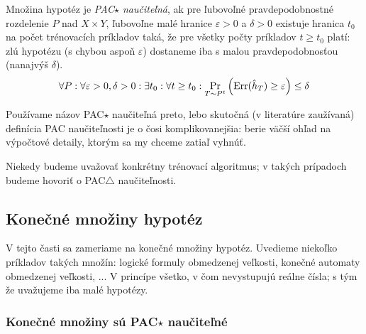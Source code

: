 \begin{definition}
  Množina hypotéz je \emph{PAC$\star$ naučiteľná}, ak pre ľubovoľné pravdepodobnostné
  rozdelenie $P$ nad $X \times Y$, ľubovoľne malé hranice $\varepsilon > 0$ a $\delta > 0$
  existuje hranica $t_0$ na počet trénovacích príkladov taká, že pre všetky
  počty príkladov $t \geq t_0$ platí: zlú hypotézu (s chybou
  aspoň $\varepsilon$) dostaneme iba s malou pravdepodobnosťou
  (nanajvýš $\delta$).
  $$ \forall P: \forall \varepsilon > 0, \delta > 0: \exists t_0: \forall t \geq t_0: \operatorname*{\textstyle\mathrm{Pr}}_{T \sim P^t} \left( \mathrm{Err}(\hat{h}_T) \geq \varepsilon \right) \leq \delta $$
\end{definition}

Používame názov PAC$\star$ naučiteľná preto, lebo skutočná (v literatúre
zaužívaná) definícia PAC naučiteľnosti je o čosi komplikovanejšia: berie
väčší ohľad na výpočtové detaily, ktorým sa my chceme zatiaľ vyhnúť.

Niekedy budeme uvažovať konkrétny trénovací algoritmus; v takých prípadoch
budeme hovoriť o PAC$\triangle$ naučiteľnosti.





\subsection{Konečné množiny hypotéz}

V tejto časti sa zameriame na konečné množiny hypotéz. Uvedieme
niekoľko príkladov takých množín: logické formuly obmedzenej
veľkosti, konečné automaty obmedzenej veľkosti, ... V princípe
všetko, v čom nevystupujú reálne čísla; s tým že uvažujeme iba
malé hypotézy.



\subsubsection{Konečné množiny sú PAC$\star$ naučiteľné}

